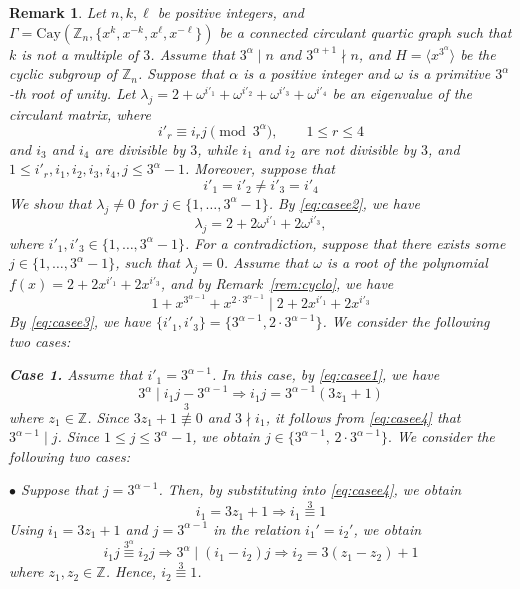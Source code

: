 \documentclass[12pt]{article}
\newtheorem{remA}[propA]{Remark}
\begin{document}
\begin{remA}\label{rem:circulant_graph_spec}
Let $n, k, \ell$ be positive integers, and $\Gamma = \mathrm{Cay}(\mathbb{Z}_n, \{x^k, x^{-k}, x^\ell, x^{-\ell}\})$ be a connected circulant quartic graph such that $k$ is not a multiple of $3$.
Assume that $3^\alpha \mid n$ and $3^{\alpha+1} \nmid n$, and
$H = \langle x^{3^\alpha} \rangle$ be the cyclic subgroup of $\mathbb{Z}_n$.
Suppose that $\alpha$ is a positive integer and $\omega$ is a primitive
$3^\alpha$-th root of unity.
Let	$\lambda_j = 2 + \omega^{i'_1} + \omega^{i'_2} + \omega^{i'_3} + \omega^{i'_4}$	be an eigenvalue of the circulant matrix, where
\begin{equation}\label{eq:casee1}
i'_r\equiv i_rj\pmod{3^\alpha},\qquad 1\le r\le4
\end{equation}	
and \(i_3\) and \(i_4\) are divisible by \(3\), while \(i_1\) and \(i_2\) are not divisible by \(3\), and
$1 \le i'_r,i_1,i_2,i_3,i_4,j \le 3^\alpha - 1$.
Moreover, suppose that
\begin{equation}\label{eq:casee2}
i'_1=i'_2\neq i'_3=i'_4
\end{equation}
We show that $\lambda_j\neq 0$ for $j\in\{1,\ldots,3^\alpha-1\}$. By \eqref{eq:casee2}, we have
\[
\lambda_j=2+2\omega^{i'_1}+2\omega^{i'_3},
\]
where $i'_1,i'_3\in\{1,\ldots,3^\alpha-1\}$. For a contradiction, suppose that there exists some $j\in\{1,\ldots,3^\alpha-1\}$, such that $\lambda_j=0$.  Assume that $\omega$ is a root of the polynomial
$
f(x)=2+2x^{i'_1}+2x^{i'_3}$, and by Remark~\ref{rem:cyclo}, we have
\begin{equation}\label{eq:casee3}
1+x^{3^{\alpha-1}}+x^{2\cdot3^{\alpha-1}}
\mid
2+2x^{i'_1}+2x^{i'_3}
\end{equation}
By \eqref{eq:casee3}, we have $\{i'_1,i'_3\}=\{3^{\alpha-1},2\cdot 3^{\alpha-1}\}$. We consider the following two cases:

\textbf{Case 1.} Assume that $i'_1=3^{\alpha-1}$. In this case, by \eqref{eq:casee1}, we have
\begin{equation}\label{eq:casee4}
3^\alpha\mid i_1j-3^{\alpha-1}
\Longrightarrow
i_1j=3^{\alpha-1}(3z_1+1)
\end{equation}
where $z_1\in\mathbb{Z}$.  Since $3z_1+1\stackrel{3}{\not\equiv}0$ and \(3\nmid i_1\), it follows from \eqref{eq:casee4} that \(3^{\alpha-1}\mid j\). Since \(1\leq j\leq 3^\alpha-1\), we obtain
$
j\in\{3^{\alpha-1},\,2\cdot 3^{\alpha-1}\}.$ We consider the following two cases:

$\bullet$ Suppose that \(j=3^{\alpha-1}\). Then, by substituting into \eqref{eq:casee4}, we obtain
\[
i_1=3z_1+1 \Longrightarrow i_1 \stackrel{3}\equiv 1
\]
Using \(i_1=3z_1+1\) and \(j=3^{\alpha-1}\) in the relation \(i_1'=i_2'\), we obtain
\[
i_1j\stackrel{3^\alpha}{\equiv} i_2j
\Longrightarrow
3^\alpha\mid (i_1-i_2)j
\Longrightarrow
i_2=3(z_1-z_2)+1
\]
where \(z_1,z_2\in\mathbb{Z}\). Hence, $i_2 \stackrel{3}\equiv 1$.


\end{remA}
\end{document}
